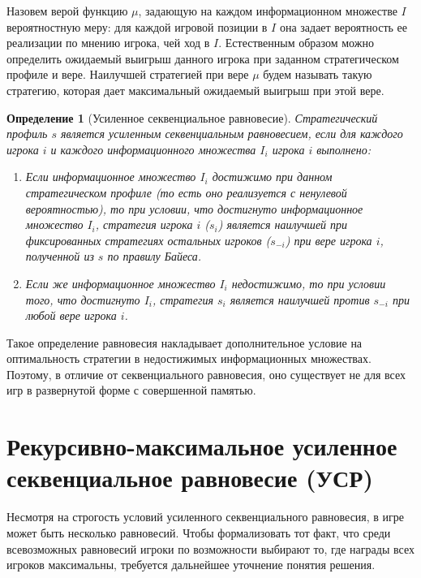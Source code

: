 \documentclass[14pt, a4paper]{extreport}
\newtheorem{definition}{\indent Определение}
\begin{document}
        Назовем верой функцию $\mu$, задающую на каждом информационном множестве $I$ вероятностную меру: для каждой игровой позиции в $I$ она задает вероятность ее реализации по мнению игрока, чей ход в $I$. Естественным образом можно определить ожидаемый выигрыш данного игрока при заданном стратегическом профиле и вере. Наилучшей стратегией при вере $\mu$ будем называть такую стратегию, которая дает максимальный ожидаемый выигрыш при этой вере.
        \begin{definition}[Усиленное секвенциальное равновесие]
            Стратегический профиль $s$ является усиленным секвенциальным равновесием, если для каждого игрока $i$ и каждого информационного множества $I_i$ игрока $i$ выполнено:

            \begin{enumerate}
                \item Если информационное множество $I_i$ достижимо при данном стратегическом профиле (то есть оно реализуется с ненулевой вероятностью), то при условии, что достигнуто информационное множество $I_i$, стратегия игрока $i$ ($s_i$) является наилучшей при фиксированных стратегиях остальных игроков ($s_{-i}$) при вере игрока $i$, полученной из $s$ по правилу Байеса.
                \item Если же информационное множество $I_i$ недостижимо, то при условии того, что достигнуто $I_i$, стратегия $s_i$ является наилучшей против $s_{-i}$ при любой вере игрока $i$.
            \end{enumerate}
        \end{definition}

        Такое определение равновесия накладывает дополнительное условие на оптимальность стратегии в недостижимых информационных множествах. Поэтому, в отличие от секвенциального равновесия, оно существует не для всех игр в развернутой форме с совершенной памятью.

        \section{Рекурсивно-максимальное усиленное секвенциальное равновесие (УСР)}

        Несмотря на строгость условий усиленного секвенциального равновесия, в игре может быть несколько равновесий. Чтобы формализовать тот факт, что среди всевозможных равновесий игроки по возможности выбирают то, где награды всех игроков максимальны, требуется дальнейшее уточнение понятия решения.
\end{document}
